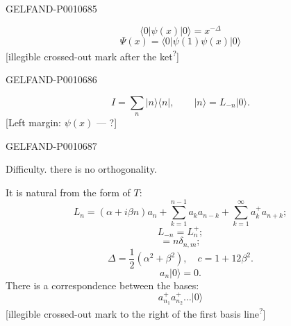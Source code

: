 \begin{GelfandAdjacentEvidence}{GELFAND-P001068}{5}

\begin{equation*}
\langle0|\psi(x)|0\rangle=x^{-\Delta}
\end{equation*}
\begin{equation*}
\Psi(x)=\langle0|\psi(1)\psi(x)|0\rangle
\end{equation*}
[illegible crossed-out mark after the ket\textsuperscript{?}]
\end{GelfandAdjacentEvidence}
\begin{GelfandAdjacentEvidence}{GELFAND-P001068}{6}

\begin{equation*}
I=\sum_n|n\rangle\langle n|,\qquad |n\rangle=L_{-n}|0\rangle.
\end{equation*}
[Left margin: $\psi(x)$ — ?]
\end{GelfandAdjacentEvidence}
\begin{GelfandAdjacentEvidence}{GELFAND-P001068}{7}


Difficulty. there is no orthogonality.

It is natural from the form of $T$:
\begin{equation*}
L_n=(\alpha+i\beta n)a_n+\sum_{k=1}^{n-1}a_ka_{n-k}+\sum_{k=1}^{\infty}a_k^+a_{n+k};
\end{equation*}
\begin{equation*}
L_{-n}=L_n^+;
\end{equation*}
\begin{equation*}
[a_n,a_m^+]=n\delta_{n,m};
\end{equation*}
\begin{equation*}
\Delta=\frac12(\alpha^2+\beta^2),\quad c=1+12\beta^2.
\end{equation*}
\begin{equation*}
a_n|0\rangle=0.
\end{equation*}
There is a correspondence between the bases:
\begin{equation*}
a_{n_1}^+a_{n_2}^+\ldots|0\rangle
\end{equation*}
[illegible crossed-out mark to the right of the first basis line\textsuperscript{?}]
\end{GelfandAdjacentEvidence}

